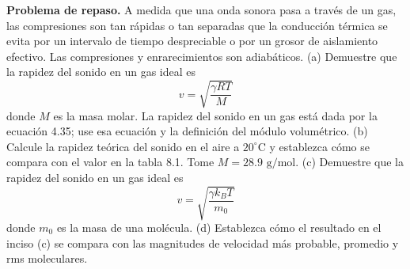 \item \textbf{Problema de repaso.} A medida que una onda sonora pasa a través de un gas, las compresiones son tan rápidas o tan separadas que la conducción térmica se evita por un intervalo de tiempo despreciable o por un grosor de aislamiento efectivo. Las compresiones y enrarecimientos son adiabáticos. 
(a) Demuestre que la rapidez del sonido en un gas ideal es
$$ v = \sqrt{\frac{\gamma RT}{M}} $$
donde $M$ es la masa molar. La rapidez del sonido en un gas está dada por la ecuación 4.35; use esa ecuación y la definición del módulo volumétrico. 
(b) Calcule la rapidez teórica del sonido en el aire a $20^\circ\text{C}$ y establezca cómo se compara con el valor en la tabla 8.1. Tome $M = 28.9\text{ g/mol}$. 
(c) Demuestre que la rapidez del sonido en un gas ideal es
$$ v = \sqrt{\frac{\gamma k_B T}{m_0}} $$
donde $m_0$ es la masa de una molécula. 
(d) Establezca cómo el resultado en el inciso (c) se compara con las magnitudes de velocidad más probable, promedio y rms moleculares.
